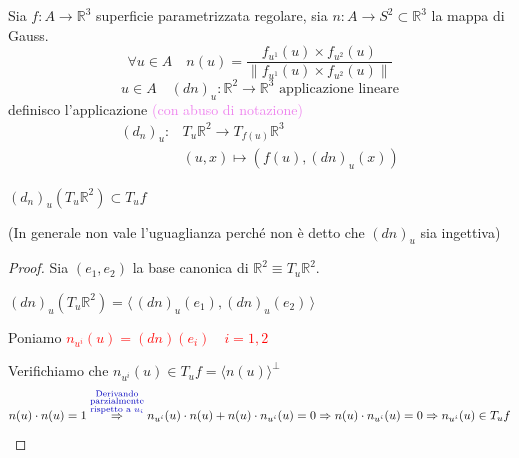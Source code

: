         \begin{definizione}
        Sia $f \colon A \to \mathbb{R}^3$ superficie parametrizzata regolare, sia $n \colon A \to S^2 \subset \mathbb{R}^3$ la mappa di Gauss.
        \[ \forall u \in A \quad n(u)= \frac{f_{u^1}(u) \times f_{u^2}(u)}{\| f_{u^1}(u) \times f_{u^2}(u) \|} \]
        \[ u \in A \quad \left(dn\right)_u \colon \mathbb{R}^2 \to \mathbb{R}^3 \text{ applicazione lineare} \]
        definisco l'applicazione \textcolor{violet}{(con abuso di notazione)} 
        \[ \begin{aligned}
            \left(d_n\right)_u \colon  & T_u \mathbb{R}^2 \to T_{f(u)} \mathbb{R}^3 \\
            & \left(u,x\right) \mapsto \left(f(u), (dn)_u(x)\right)
        \end{aligned} \]
        \end{definizione}
        \newpage
        \begin{proposizione}[\textcolor{violet}{tangenzialità del differenziale della mappa di Gauss}]
        \label{prop:tangenzialita-differenziale-mappa-Gauss}
        \mbox{}

        $(d_n)_u (T_u \mathbb{R}^2) \subset T_u f$

        \textcolor{blu}{(In generale non vale l'uguaglianza perché non è detto che $(dn)_u$ sia ingettiva)}
        \end{proposizione}
        \begin{proof}
        Sia $(e_1,e_2)$ la base canonica di $\mathbb{R}^2 \equiv T_u \mathbb{R}^2$. 

        $\left(d n\right)_u (T_u \mathbb{R}^2)=\langle \, (dn)_u(e_1), (dn)_u(e_2) \, \rangle$

        Poniamo \textcolor{red}{$n_{u^i}(u)=(dn)(e_i) \quad i=1,2$}

        Verifichiamo che $n_{u^i}(u) \in T_u f=\langle n(u) \rangle^\perp$
        \[ n(u) \cdot n(u) = 1 \overset{\textcolor{blu}{\substack{\text{Derivando} \\ \text{parzialmente} \\ \text{rispetto a } u_i}}}{\Rightarrow} n_{u^i}(u) \cdot n(u) + n(u) \cdot n_{u^i}(u) = 0 \Rightarrow n (u) \cdot n_{u^i}(u) =0 \Rightarrow n_{u^i}(u) \in T_u f \]

        \end{proof}      
